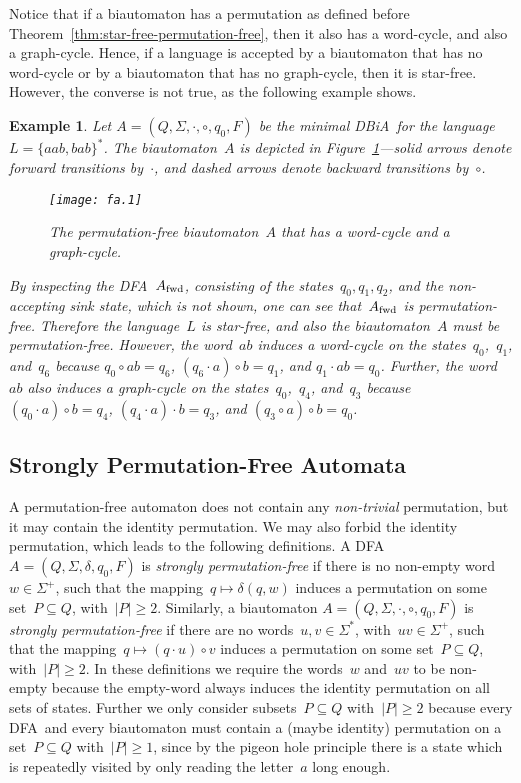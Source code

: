 \documentclass[submission]{eptcs}
\newcommand{\dfa}{\textrm{DFA}}
\newcommand{\dbia}{\textrm{DBiA}}
\newcommand{\fwd}{{\textnormal{fwd}}}
\newcommand{\abs}[1]{\left\lvert{#1}\right\rvert}
\newtheorem{example}[theorem]{Example}
\begin{document}
Notice that if a biautomaton has a permutation as defined before
Theorem~\ref{thm:star-free-permutation-free}, then it also has a
word-cycle, and also a graph-cycle.  Hence, if a language is accepted
by a biautomaton that has no word-cycle or by a biautomaton that has
no graph-cycle, then it is star-free.  However, the converse is not
true, as the following example shows.

\begin{example}
  Let $A=(Q,\Sigma,\cdot,\circ,q_0,F)$ be the \emph{minimal} \dbia\ for the
  language~$L=\{aab,bab\}^*$.  The biautomaton~$A$ is depicted in
  Figure~\ref{fig:permutation-free-with-word-graph-cycle}---solid
  arrows denote forward transitions by~$\cdot$, and dashed arrows
  denote backward transitions by~$\circ$.
\begin{figure}
    \centering
    \texttt{[image: fa.1]}
    \caption{The permutation-free biautomaton~$A$ that has a
      word-cycle and a graph-cycle.}
    \label{fig:permutation-free-with-word-graph-cycle}
  \end{figure}
By inspecting the \dfa~$A_\fwd$, consisting of the
  states~$q_0,q_1,q_2$, and the non-accepting sink state, which is not
  shown, one can see that~$A_\fwd$ is permutation-free.  Therefore the
  language~$L$ is star-free, and also the biautomaton~$A$ must be
  permutation-free.  However, the word~$ab$ induces a word-cycle on
  the states~$q_0$,~$q_1$, and~$q_6$ because $q_0\circ ab = q_6$,
  $(q_6\cdot a)\circ b = q_1$, and $q_1\cdot ab = q_0$.  Further, the
  word~$ab$ also induces a graph-cycle on the states~$q_0$,~$q_4$,
  and~$q_3$ because $(q_0\cdot a)\circ b = q_4$, $(q_4\cdot a)\cdot b
  = q_3$, and $(q_3\circ a)\circ b = q_0$.
\end{example}

\subsection{Strongly Permutation-Free Automata}
\label{sec:strongly-perm-free}

A permutation-free automaton does not contain any \emph{non-trivial}
permutation, but it may contain the identity permutation.  We may also
forbid the identity permutation, which leads to the following
definitions.
A \dfa~$A=(Q,\Sigma,\delta,q_0,F)$ is \emph{strongly permutation-free}
if there is no non-empty word~$w\in\Sigma^+$, such that the
mapping~$q\mapsto \delta(q,w)$ induces a permutation on some
set~$P\subseteq Q$, with~$\abs P\geq 2$.
Similarly, a biautomaton $A=(Q,\Sigma,\cdot,\circ,q_0,F)$ is
\emph{strongly permutation-free} if there are no
words~$u,v\in\Sigma^*$, with~$uv\in\Sigma^+$, such that the
mapping~$q\mapsto (q\cdot u)\circ v$ induces a permutation on some
set~$P\subseteq Q$, with~$\abs P\geq 2$.
In these definitions we require the words~$w$ and~$uv$ to be non-empty
because the empty-word always induces the identity permutation on all
sets of states.  Further we only consider subsets~$P\subseteq Q$
with~$\abs P\geq 2$ because every \dfa\ and every biautomaton must
contain a (maybe identity) permutation on a set~$P\subseteq Q$
with~$\abs P \geq 1$, since by the pigeon hole principle there is a
state which is repeatedly visited by only reading the letter~$a$ long
enough.
\end{document}
